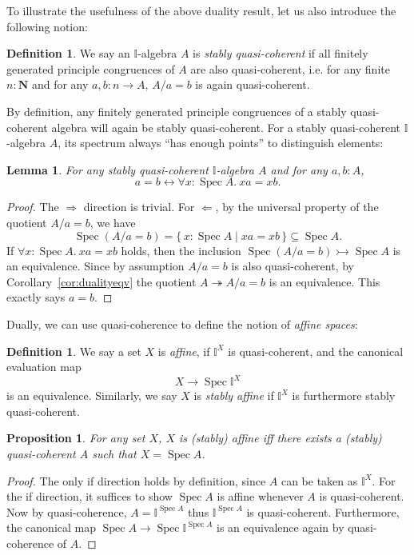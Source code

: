 \documentclass[12pt]{amsart}
\newtheorem{lemma}[theorem]{Lemma}
\newtheorem{proposition}[theorem]{Proposition}
\theoremstyle{definition}
\newtheorem{definition}[theorem]{Definition}
\newcommand{\mb}[1]{\mathbf{#1}}
\newcommand{\mbb}[1]{\mathbb{#1}}
\newcommand{\I}{\mbb I}
\newcommand{\nt}{\Rightarrow}
\newcommand{\scomp}[2]{\{\,#1\mid#2\,\}}
\newcommand{\surj}{\twoheadrightarrow}
\newcommand{\inj}{\rightarrowtail}
\newcommand{\N}{\mb N}
\newcommand{\fa}[2]{\forall #1\!\colon\!\!#2.\ }
\newcommand{\eq}{\leftrightarrow}
\newcommand{\spec}{\operatorname{Spec}}
\begin{document}
To illustrate the usefulness of the above duality result, let us also introduce the following notion: 
\begin{definition}
  We say an $\I$-algebra $A$ is \emph{stably quasi-coherent} if all finitely generated principle congruences of $A$ are also quasi-coherent, i.e. for any finite $n : \N$ and for any $a,b : n \to A$, $A/a = b$ is again quasi-coherent.
\end{definition}
 
By definition, any finitely generated principle congruences of a stably quasi-coherent algebra will again be stably quasi-coherent. For a stably quasi-coherent $\I$-algebra $A$,  its spectrum always ``has enough points'' to distinguish elements:

\begin{lemma}\label{lem:completeness}
  For any stably quasi-coherent $\I$-algebra $A$ and for any $a,b : A$,
  \[ a = b \eq \fa x{\spec A} xa = xb. \]
\end{lemma}
\begin{proof}
  The $\nt$ direction is trivial. For $\Leftarrow$, by the universal property of the quotient $A/a = b$, we have
  \[ \spec(A/a = b) = \scomp{x : \spec A}{xa = xb} \subseteq \spec A. \]
  If $\fa x{\spec A}xa = xb$ holds, then the inclusion $\spec(A/a = b) \inj \spec A$ is an equivalence. Since by assumption $A/a=b$ is also quasi-coherent, by Corollary~\ref{cor:dualityeqv} the quotient $A \surj A/a=b$ is an equivalence. This exactly says $a = b$.
\end{proof}

Dually, we can use quasi-coherence to define the notion of \emph{affine spaces}:

\begin{definition}
  We say a set $X$ is \emph{affine}, if $\I^X$ is quasi-coherent, and the canonical evaluation map
  \[ X \to \spec \I^X \]
  is an equivalence. Similarly, we say $X$ is \emph{stably affine} if $\I^X$ is furthermore stably quasi-coherent.
\end{definition}

\begin{proposition}
  For any set $X$, $X$ is (stably) affine iff there exists a (stably) quasi-coherent $A$ such that $X = \spec A$.
\end{proposition}
\begin{proof}
  The only if direction holds by definition, since $A$ can be taken as $\I^X$. For the if direction, it suffices to show $\spec A$ is affine whenever $A$ is quasi-coherent. Now by quasi-coherence, $A = \I^{\spec A}$ thus $\I^{\spec A}$ is quasi-coherent. Furthermore, the canonical map $\spec A \to \spec \I^{\spec A}$ is an equivalence again by quasi-coherence of $A$.
\end{proof}
\end{document}
